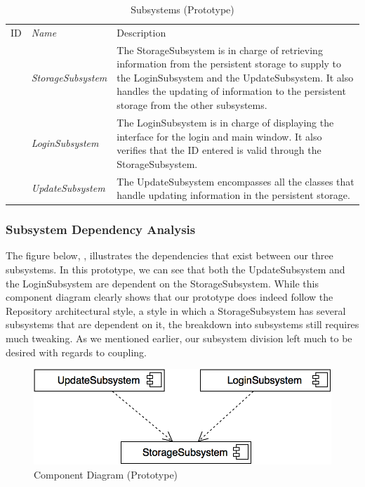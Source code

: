 \documentclass[12pt,letterpaper]{article}
\begin{document}
\begin{table}[H]
	\caption{Subsystems (Prototype)} 
    \begin{tabu} to 
        \tableheader{}ID & Name & Description \\
         & StorageSubsystem & The StorageSubsystem is in charge of retrieving information from the persistent storage to supply to the LoginSubsystem and the UpdateSubsystem. It also handles the updating of information to the persistent storage from the other subsystems.\\
         & LoginSubsystem & The LoginSubsystem is in charge of displaying the interface for the login and main window. It also verifies that the ID entered is valid through the StorageSubsystem. \\
         & UpdateSubsystem & The UpdateSubsystem encompasses all the classes that handle updating information in the persistent storage.\\
    \end{tabu}
\end{table}

\subsubsection{Subsystem Dependency Analysis}

The figure below, , illustrates the dependencies that exist between our three subsystems. In this prototype, we can see that both the UpdateSubsystem and the LoginSubsystem are dependent on the StorageSubsystem. While this component diagram clearly shows that our prototype does indeed follow the Repository architectural style, a style in which a StorageSubsystem has several subsystems that are dependent on it, the breakdown into subsystems still requires much tweaking. As we mentioned earlier, our subsystem division left much to be desired with regards to coupling.

\begin{figure}[H]
	\centering{}
	\includegraphics[scale=0.35]{imgs/d3/prototype/component-diagram.png}
	\caption{Component Diagram (Prototype)}
\end{figure}
\end{document}
